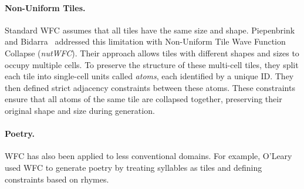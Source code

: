 \documentclass[../../main.tex]{subfiles}
\begin{document}
\paragraph{Non-Uniform Tiles.}

Standard WFC assumes that all tiles have the same size and shape. Piepenbrink and Bidarra~ addressed this limitation with Non-Uniform Tile Wave Function Collapse (\emph{nutWFC}). Their approach allows tiles with different shapes and sizes to occupy multiple cells. To preserve the structure of these multi-cell tiles, they split each tile into single-cell units called \textit{atoms}, each identified by a unique ID. They then defined strict adjacency constraints between these atoms. These constraints ensure that all atoms of the same tile are collapsed together, preserving their original shape and size during generation.

\paragraph{Poetry.}

WFC has also been applied to less conventional domains. For example, O'Leary~ used WFC to generate poetry by treating syllables as tiles and defining constraints based on rhymes.
\end{document}
